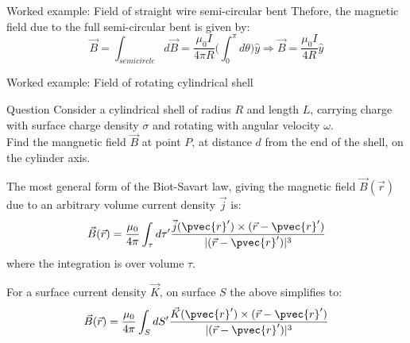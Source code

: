 {\begin{frame}{Worked example: Field of straight wire semi-circular bent}
Thefore, the magnetic field due to the full semi-circular bent is given by:
\begin{equation*}
  \vec{B} = \int_{semicircle} d\vec{B} =
     \frac{\mu_0I}{4\pi R} \Bigg( \int_{0}^{\pi} d\theta \Bigg) \hat{y} \Rightarrow
  \vec{B} = \frac{\mu_0I}{4 R} \hat{y}
\end{equation*}


\end{frame}


} %



%
%

{
\problemslide

%
%
%

\begin{frame}{Worked example: Field of rotating cylindrical shell}

  \begin{blockexmplque}{Question}
    Consider a cylindrical shell of radius $R$ and length $L$,
    carrying charge with surface charge density $\sigma$ and rotating with
    angular velocity $\omega$.\\
    Find the mangnetic field $\vec{B}$ at point $P$,
    at distance $d$ from the end of the shell, on the cylinder axis.
  \end{blockexmplque}

  The most general form of the Biot-Savart law, giving the magnetic
  field $\vec{B}(\vec{r})$ due to an arbitrary volume current density $\vec{j}$ is:
  \begin{equation*}
    \vec{B}(\vec{r}) = \frac{\mu_0}{4\pi}
      \int_{\tau} d\tau^\prime
      \frac{\vec{j}(\pvec{r}') \times (\vec{r}-\pvec{r}')}{|(\vec{r}-\pvec{r}')|^3}
  \end{equation*}
  where the integration is over volume $\tau$.

  For a surface current density $\vec{K}$, on surface $S$ the above simplifies to:
  \begin{equation*}
    \vec{B}(\vec{r}) = \frac{\mu_0}{4\pi}
      \int_{S} dS^\prime
      \frac{\vec{K}(\pvec{r}') \times (\vec{r}-\pvec{r}')}{|(\vec{r}-\pvec{r}')|^3}
  \end{equation*}

\end{frame}

%
%
%

}
